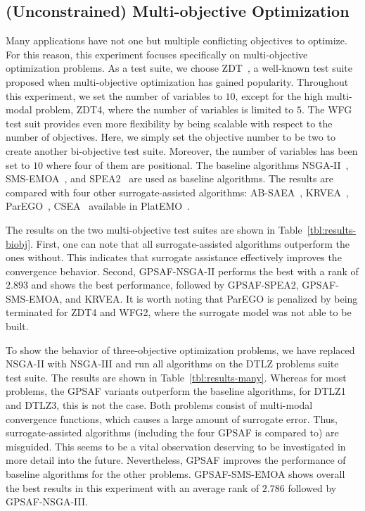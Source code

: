 \documentclass[journal]{IEEEtran}
\begin{document}
\subsection{(Unconstrained) Multi-objective Optimization}







Many applications have not one but multiple conflicting objectives to optimize. For this reason, this experiment focuses specifically on multi-objective optimization problems. As a test suite, we choose ZDT~\cite{2000-zitzler-zdt}, a well-known test suite proposed when multi-objective optimization has gained popularity. Throughout this experiment, we set the number of variables to $10$, except for the high multi-modal problem, ZDT4, where the number of variables is limited to $5$. The WFG~\cite{2005-wfg} test suit provides even more flexibility by being scalable with respect to the number of objectives. Here, we simply set the objective number to be two to create another bi-objective test suite. Moreover, the number of variables has been set to $10$ where four of them are positional.
The baseline algorithms NSGA-II~\cite{2002-deb-nsga2}, SMS-EMOA~\cite{2007-beume-sms-emoa}, and SPEA2~\cite{2001-zitzler-spea2} are used as baseline algorithms.
The results are compared with four other surrogate-assisted algorithms: AB-SAEA~\cite{2020-wang-absea}, KRVEA~\cite{2016-chugh-krvea}, ParEGO~\cite{2006-knowles-parego}, CSEA~\cite{2019-pan-csea} available in PlatEMO~\cite{2017-platemo}.


The results on the two multi-objective test suites are shown in Table~\ref{tbl:results-biobj}. First, one can note that all surrogate-assisted algorithms outperform the ones without. This indicates that surrogate assistance effectively improves the convergence behavior. 
Second, GPSAF-NSGA-II performs the best with a rank of $2.893$ and shows the best performance, followed by GPSAF-SPEA2, GPSAF-SMS-EMOA, and KRVEA. It is worth noting that ParEGO is penalized by being terminated for ZDT4 and WFG2, where the surrogate model was not able to be built.

To show the behavior of three-objective optimization problems, we have replaced NSGA-II with NSGA-III and run all algorithms on the DTLZ problems suite~\cite{2005-deb-dtlz} test suite. The results are shown in Table~\ref{tbl:results-many}. Whereas for most problems, the GPSAF variants outperform the baseline algorithms, for DTLZ1 and DTLZ3, this is not the case. Both problems consist of multi-modal convergence functions, which causes a large amount of surrogate error. Thus, surrogate-assisted algorithms (including the four GPSAF is compared to) are misguided. This seems to be a vital observation deserving to be investigated in more detail into the future. Nevertheless, GPSAF improves the performance of baseline algorithms for the other problems. GPSAF-SMS-EMOA shows overall the best results in this experiment with an average rank of $2.786$ followed by GPSAF-NSGA-III.
\end{document}
